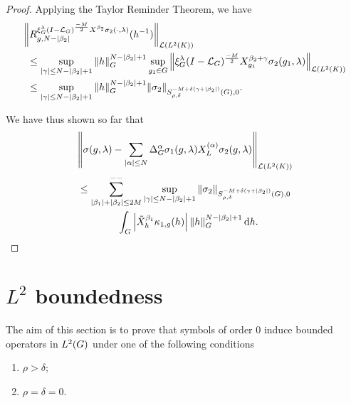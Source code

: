 \begin{proof}
    Applying the Taylor Reminder Theorem,
    we have
    \begin{align*}
        &\norm [\Lin {\Lebesgue 2 \CompactGroup}] {\TaylorRemainder {\Rep \lambda \BesselPotential {-M} \LeftDifferentialOperator {\beta_2} \sigma_2(\dummy, \lambda)} g {N - \abs {\beta_2}} (h^{-1})}\\
        &\ \leq
        \sup_{\abs \gamma \leq N - \abs {\beta_2} + 1}
        \norm [\Group] h^{N - \abs {\beta_2} + 1}
        \sup_{g_1 \in \Group}
        \norm [\Lin {\Lebesgue 2 \CompactGroup}] {%
            \Rep \lambda \BesselPotential {-M}
            \LeftDifferentialOperator [g_1] {\beta_2 + \gamma} \sigma_2(g_1, \lambda)
        }\\
        & \ \leq
        \sup_{\abs \gamma \leq N - \abs {\beta_2} + 1}
        \norm [\Group] h^{N - \abs {\beta_2} + 1}
        \SymbolSemiNorm {-M + \delta(\gamma + \abs {\beta_2})} {\rho, \delta} {0} {\sigma_2}.
    \end{align*}

    We have thus shown so far that
    \begin{align*}
        &\norm [\Lin {\Lebesgue 2 \CompactGroup}] {\sigma(g, \lambda) - \sum_{\abs \alpha \leq N} \DifferenceOperatorOrder \alpha \sigma_1(g, \lambda) \TaylorLeftDifferentialOperator \alpha \sigma_2(g, \lambda)}\\
        &\leq
        \lcsum{\abs {\beta_1} + \abs {\beta_2} \leq 2M}
        \sup_{\abs \gamma \leq N - \abs {\beta_2} + 1}
        \SymbolSemiNorm {-M + \delta(\gamma + \abs {\beta_2})} {\rho, \delta} {0} {\sigma_2}\\
        &\qquad \qquad
        \int_\Group \abs {\RightDifferentialOperator[h] {\beta_1} \kappa_{1, g}(h)} \norm [\Group] h^{N - \abs {\beta_2} + 1} \dd h.
    \end{align*}
\end{proof}

\section{\texorpdfstring{$L^2$}{L2} boundedness}

The aim of this section is to prove
that symbols of order $0$ induce bounded operators in ${L^{2} (G)}$
under one of the following conditions

\begin{enumerate}
    \item $\rho > \delta$;
    \item $\rho = \delta = 0$.
\end{enumerate}

